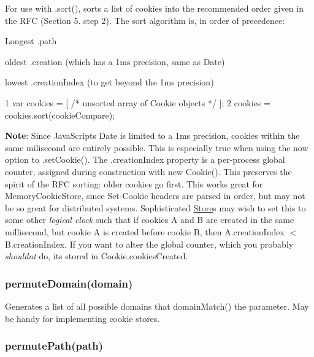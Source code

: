 For use with {\ttfamily .sort()}, sorts a list of cookies into the recommended order given in the R\+F\+C (Section 5. step 2). The sort algorithm is, in order of precedence\+:


\begin{DoxyItemize}
\item Longest {\ttfamily .path}
\item oldest {\ttfamily .creation} (which has a 1ms precision, same as {\ttfamily Date})
\item lowest {\ttfamily .creation\+Index} (to get beyond the 1ms precision)
\end{DoxyItemize}


\begin{DoxyCode}
1 var cookies = [ /* unsorted array of Cookie objects */ ];
2 cookies = cookies.sort(cookieCompare);
\end{DoxyCode}


{\bfseries Note}\+: Since Java\+Script\textquotesingle{}s {\ttfamily Date} is limited to a 1ms precision, cookies within the same milisecond are entirely possible. This is especially true when using the {\ttfamily now} option to {\ttfamily .set\+Cookie()}. The {\ttfamily .creation\+Index} property is a per-\/process global counter, assigned during construction with {\ttfamily new Cookie()}. This preserves the spirit of the R\+F\+C sorting\+: older cookies go first. This works great for {\ttfamily Memory\+Cookie\+Store}, since {\ttfamily Set-\/\+Cookie} headers are parsed in order, but may not be so great for distributed systems. Sophisticated {\ttfamily \hyperlink{class_store}{Store}}s may wish to set this to some other {\itshape logical clock} such that if cookies A and B are created in the same millisecond, but cookie A is created before cookie B, then {\ttfamily A.\+creation\+Index $<$ B.\+creation\+Index}. If you want to alter the global counter, which you probably {\itshape shouldn\textquotesingle{}t} do, it\textquotesingle{}s stored in {\ttfamily Cookie.\+cookies\+Created}.

\subsubsection*{{\ttfamily permute\+Domain(domain)}}

Generates a list of all possible domains that {\ttfamily domain\+Match()} the parameter. May be handy for implementing cookie stores.

\subsubsection*{{\ttfamily permute\+Path(path)}}

